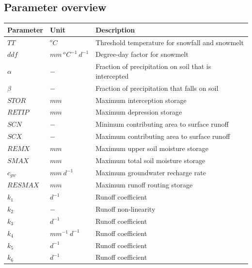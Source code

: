 \newpage
\subsection{Parameter overview}
\begin{table}[htbp]
  \centering
    \begin{tabular}{lll}
    \toprule
    Parameter & Unit  & Description \\
    \midrule
    $TT$  & $^oC$ & Threshold temperature for snowfall and snowmelt \\
    $ddf$ & $mm~^oC^{-1}~d^{-1}$ & Degree-day factor for snowmelt \\
    $\alpha$ & $-$   & Fraction of precipitation on soil that is intercepted \\
    $\beta$ & $-$   & Fraction of precipitation that falls on soil \\
    $STOR$ & $mm$  & Maximum interception storage \\
    $RETIP$ & $mm$  & Maximum depression storage \\
    $SCN$ & $-$   & Minimum contributing area to surface runoff \\
    $SCX$ & $-$   & Maximum contributing area to surface runoff \\
    $REMX$ & $mm$  & Maximum upper soil moisture storage \\
    $SMAX$ & $mm$  & Maximum total soil moisture storage \\
    $c_{gw}$ & $mm~d^{-1}$ & Maximum groundwater recharge rate \\
    $RESMAX$ & $mm$  & Maximum runoff routing storage \\
    $k_1$ & $d^{-1}$ & Runoff coefficient \\
    $k_2$ & $-$   & Runoff non-linearity \\
    $k_3$ & $d^{-1}$ & Runoff coefficient \\
    $k_4$ & $mm^{-1}~d^{-1}$ & Runoff coefficient \\
    $k_5$ & $d^{-1}$ & Runoff coefficient \\
    $k_6$ & $d^{-1}$ & Runoff coefficient \\
    \bottomrule
    \end{tabular}%
  \label{tab:addlabel}%
\end{table}%

